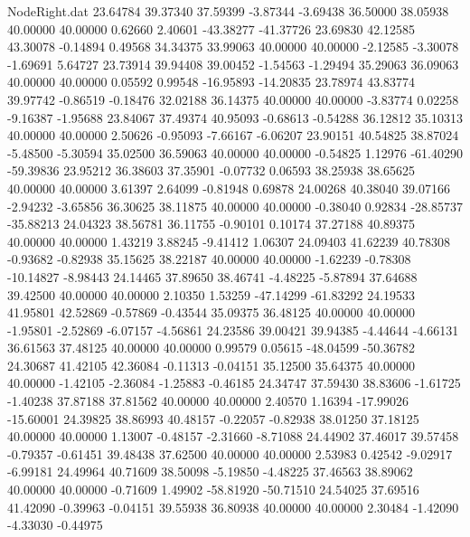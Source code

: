 \begin{filecontents}{NodeRight.dat}
  23.64784   39.37340   37.59399    -3.87344   -3.69438   36.50000   38.05938   40.00000   40.00000    0.62660    2.40601  -43.38277  -41.37726
  23.69830   42.12585   43.30078    -0.14894    0.49568   34.34375   33.99063   40.00000   40.00000   -2.12585   -3.30078   -1.69691    5.64727
  23.73914   39.94408   39.00452    -1.54563   -1.29494   35.29063   36.09063   40.00000   40.00000    0.05592    0.99548  -16.95893  -14.20835
  23.78974   43.83774   39.97742    -0.86519   -0.18476   32.02188   36.14375   40.00000   40.00000   -3.83774    0.02258   -9.16387   -1.95688
  23.84067   37.49374   40.95093    -0.68613   -0.54288   36.12812   35.10313   40.00000   40.00000    2.50626   -0.95093   -7.66167   -6.06207
  23.90151   40.54825   38.87024    -5.48500   -5.30594   35.02500   36.59063   40.00000   40.00000   -0.54825    1.12976  -61.40290  -59.39836
  23.95212   36.38603   37.35901    -0.07732    0.06593   38.25938   38.65625   40.00000   40.00000    3.61397    2.64099   -0.81948    0.69878
  24.00268   40.38040   39.07166    -2.94232   -3.65856   36.30625   38.11875   40.00000   40.00000   -0.38040    0.92834  -28.85737  -35.88213
  24.04323   38.56781   36.11755    -0.90101    0.10174   37.27188   40.89375   40.00000   40.00000    1.43219    3.88245   -9.41412    1.06307
  24.09403   41.62239   40.78308    -0.93682   -0.82938   35.15625   38.22187   40.00000   40.00000   -1.62239   -0.78308  -10.14827   -8.98443
  24.14465   37.89650   38.46741    -4.48225   -5.87894   37.64688   39.42500   40.00000   40.00000    2.10350    1.53259  -47.14299  -61.83292
  24.19533   41.95801   42.52869    -0.57869   -0.43544   35.09375   36.48125   40.00000   40.00000   -1.95801   -2.52869   -6.07157   -4.56861
  24.23586   39.00421   39.94385    -4.44644   -4.66131   36.61563   37.48125   40.00000   40.00000    0.99579    0.05615  -48.04599  -50.36782
  24.30687   41.42105   42.36084    -0.11313   -0.04151   35.12500   35.64375   40.00000   40.00000   -1.42105   -2.36084   -1.25883   -0.46185
  24.34747   37.59430   38.83606    -1.61725   -1.40238   37.87188   37.81562   40.00000   40.00000    2.40570    1.16394  -17.99026  -15.60001
  24.39825   38.86993   40.48157    -0.22057   -0.82938   38.01250   37.18125   40.00000   40.00000    1.13007   -0.48157   -2.31660   -8.71088
  24.44902   37.46017   39.57458    -0.79357   -0.61451   39.48438   37.62500   40.00000   40.00000    2.53983    0.42542   -9.02917   -6.99181
  24.49964   40.71609   38.50098    -5.19850   -4.48225   37.46563   38.89062   40.00000   40.00000   -0.71609    1.49902  -58.81920  -50.71510
  24.54025   37.69516   41.42090    -0.39963   -0.04151   39.55938   36.80938   40.00000   40.00000    2.30484   -1.42090   -4.33030   -0.44975

\end{filecontents}
